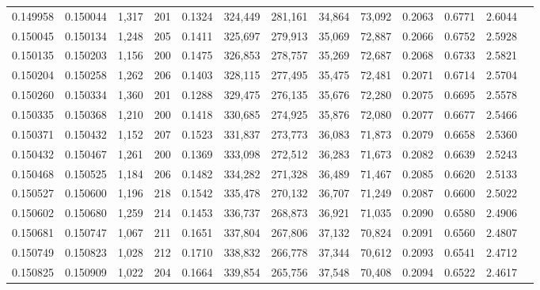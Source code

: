 \begin{tabular}{rrrrrrrrrrrrr}
0.149958 & 0.150044 & 1,317 & 201 &                                     0.1324 & 324,449 & 281,161 &  34,864 &  73,092 & 0.2063 & 0.6771 & 2.6044 \\
0.150045 & 0.150134 & 1,248 & 205 &                                     0.1411 & 325,697 & 279,913 &  35,069 &  72,887 & 0.2066 & 0.6752 & 2.5928 \\
0.150135 & 0.150203 & 1,156 & 200 &                                     0.1475 & 326,853 & 278,757 &  35,269 &  72,687 & 0.2068 & 0.6733 & 2.5821 \\
0.150204 & 0.150258 & 1,262 & 206 &                                     0.1403 & 328,115 & 277,495 &  35,475 &  72,481 & 0.2071 & 0.6714 & 2.5704 \\
0.150260 & 0.150334 & 1,360 & 201 &                                     0.1288 & 329,475 & 276,135 &  35,676 &  72,280 & 0.2075 & 0.6695 & 2.5578 \\
0.150335 & 0.150368 & 1,210 & 200 &                                     0.1418 & 330,685 & 274,925 &  35,876 &  72,080 & 0.2077 & 0.6677 & 2.5466 \\
0.150371 & 0.150432 & 1,152 & 207 &                                     0.1523 & 331,837 & 273,773 &  36,083 &  71,873 & 0.2079 & 0.6658 & 2.5360 \\
0.150432 & 0.150467 & 1,261 & 200 &                                     0.1369 & 333,098 & 272,512 &  36,283 &  71,673 & 0.2082 & 0.6639 & 2.5243 \\
0.150468 & 0.150525 & 1,184 & 206 &                                     0.1482 & 334,282 & 271,328 &  36,489 &  71,467 & 0.2085 & 0.6620 & 2.5133 \\
0.150527 & 0.150600 & 1,196 & 218 &                                     0.1542 & 335,478 & 270,132 &  36,707 &  71,249 & 0.2087 & 0.6600 & 2.5022 \\
0.150602 & 0.150680 & 1,259 & 214 &                                     0.1453 & 336,737 & 268,873 &  36,921 &  71,035 & 0.2090 & 0.6580 & 2.4906 \\
0.150681 & 0.150747 & 1,067 & 211 &                                     0.1651 & 337,804 & 267,806 &  37,132 &  70,824 & 0.2091 & 0.6560 & 2.4807 \\
0.150749 & 0.150823 & 1,028 & 212 &                                     0.1710 & 338,832 & 266,778 &  37,344 &  70,612 & 0.2093 & 0.6541 & 2.4712 \\
0.150825 & 0.150909 & 1,022 & 204 &                                     0.1664 & 339,854 & 265,756 &  37,548 &  70,408 & 0.2094 & 0.6522 & 2.4617 \\

\end{tabular}
